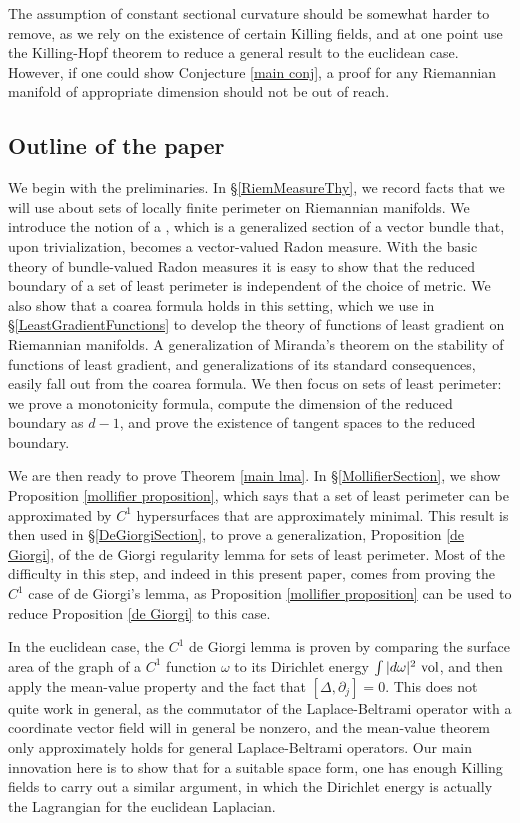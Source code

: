 The assumption of constant sectional curvature should be somewhat harder to remove, as we rely on the existence of certain Killing fields, and at one point use the Killing-Hopf theorem to reduce a general result to the euclidean case.
However, if one could show Conjecture \ref{main conj}, a proof for any Riemannian manifold of appropriate dimension should not be out of reach.


\subsection{Outline of the paper}
We begin with the preliminaries.
In \S\ref{RiemMeasureThy}, we record facts that we will use about sets of locally finite perimeter on Riemannian manifolds.
We introduce the notion of a , which is a generalized section of a vector bundle that, upon trivialization, becomes a vector-valued Radon measure.
With the basic theory of bundle-valued Radon measures it is easy to show that the reduced boundary of a set of least perimeter is independent of the choice of metric.
We also show that a coarea formula holds in this setting, which we use in \S\ref{LeastGradientFunctions} to develop the theory of functions of least gradient on Riemannian manifolds. A generalization of Miranda's theorem \cite[Teorema 3]{Miranda67} on the stability of functions of least gradient, and generalizations of its standard consequences, easily fall out from the coarea formula.
We then focus on sets of least perimeter: we prove a monotonicity formula, compute the dimension of the reduced boundary as $d - 1$, and prove the existence of tangent spaces to the reduced boundary.

We are then ready to prove Theorem \ref{main lma}.
In \S\ref{MollifierSection}, we show Proposition \ref{mollifier proposition}, which says that a set of least perimeter can be approximated by $C^1$ hypersurfaces that are approximately minimal.
This result is then used in \S\ref{DeGiorgiSection}, to prove a generalization, Proposition \ref{de Giorgi}, of the de Giorgi regularity lemma \cite[Teorema 5.7]{Miranda66} for sets of least perimeter.
Most of the difficulty in this step, and indeed in this present paper, comes from proving the $C^1$ case of de Giorgi's lemma, as Proposition \ref{mollifier proposition} can be used to reduce Proposition \ref{de Giorgi} to this case.

In the euclidean case, the $C^1$ de Giorgi lemma is proven by comparing the surface area of the graph of a $C^1$ function $\omega$ to its Dirichlet energy $\int |d\omega|^2~\mathrm{vol}$, and then apply the mean-value property and the fact that $[\Delta, \partial_j] = 0$.
This does not quite work in general, as the commutator of the Laplace-Beltrami operator with a coordinate vector field will in general be nonzero, and the mean-value theorem only approximately holds for general Laplace-Beltrami operators.
Our main innovation here is to show that for a suitable space form, one has enough Killing fields to carry out a similar argument, in which the Dirichlet energy is actually the Lagrangian for the euclidean Laplacian.

